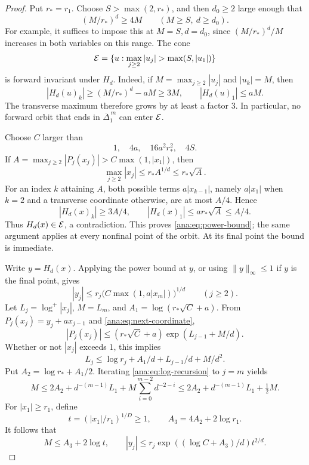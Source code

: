 \begin{proof}
Put \(r_*=r_1\).  Choose \(S>\max(2,r_*)\), and then \(d_0\geq2\)
large enough that
\[
 (M/r_*)^d\geq4M\qquad(M\geq S,\ d\geq d_0).
\]
For example, it suffices to impose this at \(M=S,d=d_0\), since
\((M/r_*)^d/M\) increases in both variables on this range.
The cone
\[
 {\cal E}=\{u:\max_{j\geq2}|u_j|>\max(S,|u_1|)\}
\]
is forward invariant under \(H_d\).  Indeed, if
\(M=\max_{j\geq2}|u_j|\) and \(|u_k|=M\), then
\[
 |H_d(u)_k|\geq(M/r_*)^d-aM\geq3M,
 \qquad |H_d(u)_1|\leq aM.
\]
The transverse maximum therefore grows by at least a factor \(3\).
In particular, no forward orbit that ends in
\(\overline\Delta_1^{\,m}\) can enter \({\cal E}\).

Choose \(C\) larger than
\[
 1,\quad 4a,\quad 16a^2r_*^2,\quad 4S.
\]
If \(A=\max_{j\geq2}|P_j(x_j)|>C\max(1,|x_1|)\), then
\[
 \max_{j\geq2}|x_j|\leq r_* A^{1/d}\leq r_*\sqrt A.
\]
For an index \(k\) attaining \(A\), both possible terms
\(a|x_{k-1}|\), namely \(a|x_1|\) when \(k=2\) and a transverse
coordinate otherwise, are at most \(A/4\).  Hence
\[
 |H_d(x)_k|\geq3A/4,\qquad
 |H_d(x)_1|\leq a r_*\sqrt A\leq A/4.
\]
Thus \(H_d(x)\in{\cal E}\), a contradiction.  This proves
\eqref{ana:eq:power-bound}; the same argument applies at every
nonfinal point of the orbit.  At its final point the bound is
immediate.

Write \(y=H_d(x)\).  Applying the power bound at \(y\), or using
\(\|y\|_\infty\leq1\) if \(y\) is the final point, gives
\begin{equation}\label{ana:eq:next-coordinate}
 |y_j|\leq r_j\bigl(C\max(1,a|x_m|)\bigr)^{1/d}
 \qquad(j\geq2).
\end{equation}
Let \(L_j=\log^+|x_j|\), \(M=L_m\), and
\(A_1=\log(r_*\sqrt C+a)\).  From
\(P_j(x_j)=y_j+a x_{j-1}\) and
\eqref{ana:eq:next-coordinate},
\[
 |P_j(x_j)|
 \leq (r_*\sqrt C+a)\exp(L_{j-1}+M/d).
\]
Whether or not \(|x_j|\) exceeds \(1\), this implies
\begin{equation}\label{ana:eq:log-recursion}
 L_j\leq \log r_j+A_1/d+L_{j-1}/d+M/d^2.
\end{equation}
Put \(A_2=\log r_*+A_1/2\).  Iterating
\eqref{ana:eq:log-recursion} to \(j=m\) yields
\[
 M\leq 2A_2+d^{-(m-1)}L_1+
       M\sum_{i=0}^{m-2}d^{-2-i}
 \leq 2A_2+d^{-(m-1)}L_1+\tfrac12M.
\]
For \(|x_1|\geq r_1\), define
\[
 t=(|x_1|/r_1)^{1/D}\geq1,\qquad
 A_3=4A_2+2\log r_1.
\]
It follows that
\[
 M\leq A_3+2\log t,\qquad
 |y_j|\leq r_j\exp((\log C+A_3)/d)t^{2/d}.
\]


\end{proof}
